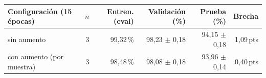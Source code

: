 \begin{tabular}{lrrrrr}
\toprule
Configuración (15 épocas) & $n$ & Entren. (eval) & Validación (\%) & Prueba (\%) & Brecha \\
\midrule
sin aumento & 3 & 99,32\,\% & 98,23 $\pm$ 0,18 & 94,15 $\pm$ 0,18 & 1,09\,pts \\
con aumento (por muestra) & 3 & 98,48\,\% & 98,08 $\pm$ 0,18 & 93,96 $\pm$ 0,14 & 0,40\,pts \\
\bottomrule
\end{tabular}
